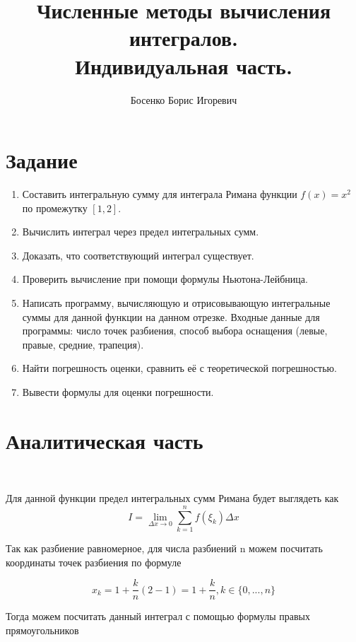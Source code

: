 \documentclass[12pt, a4paper]{report}
\author{Босенко Борис Игоревич}
\title{Численные методы вычисления интегралов.\\ Индивидуальная часть.}
\begin{document}
	
	\maketitle
	
	\tableofcontents
	
	\pagestyle{plain}
	
	\section*{Задание}
	
	\begin{enumerate}
	
		\item Составить интегральную сумму для интеграла Римана функции $f(x) = x^2$ по промежутку $[1, 2]$.
		\item Вычислить интеграл через предел интегральных сумм. 
		\item Доказать, что соответствующий интеграл существует. 
		\item Проверить вычисление при помощи формулы Ньютона-Лейбница. 
		\item Написать программу, вычисляющую и отрисовывающую интегральные суммы для данной функции на данном отрезке. Входные данные для программы: число точек разбиения, способ выбора оснащения (левые, правые, средние, трапеция). 
		\item Найти погрешность оценки, сравнить её с теоретической погрешностью. 
		\item Вывести формулы для оценки погрешности. 
	
	\end{enumerate}

	\newpage
	
	
	\section*{Аналитическая часть}
	
	\
	
	Для данной функции предел интегральных сумм Римана будет выглядеть как 
	\[I = \lim_{\Delta x \to 0} \sum_{k=1}^{n} f(\xi_k)\Delta x \]
	
	Так как разбиение равномерное, для числа разбиений n можем посчитать координаты точек разбиения по формуле
	
	\[x_k = 1 + \frac{k}{n} ( 2 - 1 ) = 1 + \frac{k}{n}, k \in \{0, ..., n\}\]
	
	Тогда можем посчитать данный интеграл с помощью формулы правых прямоугольников
	
\end{document}
